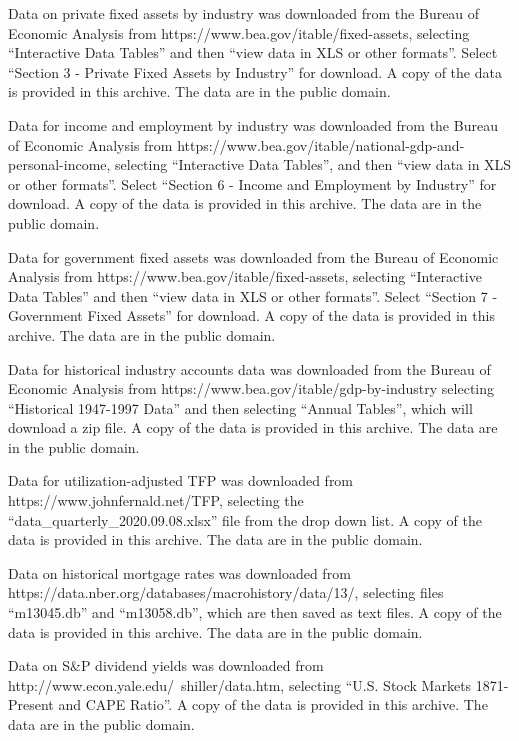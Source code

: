 \documentclass[
]{article}
\begin{document}
Data on private fixed assets by industry was downloaded from the Bureau of Economic Analysis \citep{beacap} from https://www.bea.gov/itable/fixed-assets, selecting ``Interactive Data Tables'' and then ``view data in XLS or other formats''. Select ``Section 3 - Private Fixed Assets by Industry'' for download. A copy of the data is provided in this archive. The data are in the public domain.

Data for income and employment by industry was downloaded from the Bureau of Economic Analysis \citep{beasection6} from https://www.bea.gov/itable/national-gdp-and-personal-income, selecting ``Interactive Data Tables'', and then ``view data in XLS or other formats''. Select ``Section 6 - Income and Employment by Industry'' for download. A copy of the data is provided in this archive. The data are in the public domain.

Data for government fixed assets was downloaded from the Bureau of Economic Analysis \citep{beagov} from https://www.bea.gov/itable/fixed-assets, selecting ``Interactive Data Tables'' and then ``view data in XLS or other formats''. Select ``Section 7 - Government Fixed Assets'' for download. A copy of the data is provided in this archive. The data are in the public domain.

Data for historical industry accounts data was downloaded from the Bureau of Economic Analysis \citep{beahistind} from https://www.bea.gov/itable/gdp-by-industry selecting ``Historical 1947-1997 Data'' and then selecting ``Annual Tables'', which will download a zip file. A copy of the data is provided in this archive. The data are in the public domain.

Data for utilization-adjusted TFP \citep{fernalddata} was downloaded from https://www.johnfernald.net/TFP, selecting the ``data\_quarterly\_2020.09.08.xlsx'' file from the drop down list. A copy of the data is provided in this archive. The data are in the public domain.

Data on historical mortgage rates \citep{nberhistory} was downloaded from https://data.nber.org/databases/macrohistory/data/13/, selecting files ``m13045.db'' and ``m13058.db'', which are then saved as text files. A copy of the data is provided in this archive. The data are in the public domain.

Data on S\&P dividend yields \citep{shiller} was downloaded from http://www.econ.yale.edu/~shiller/data.htm, selecting ``U.S. Stock Markets 1871-Present and CAPE Ratio''. A copy of the data is provided in this archive. The data are in the public domain.
\end{document}
